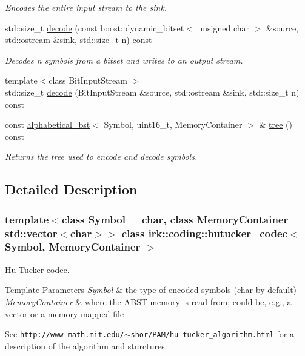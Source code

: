 \begin{DoxyCompactItemize}
\begin{DoxyCompactList}\small\item\em Encodes the entire input stream to the sink. \end{DoxyCompactList}\item 
std\+::size\+\_\+t \mbox{\hyperlink{classirk_1_1coding_1_1hutucker__codec_a888f087a0e3f164fdc79447af8be45d6}{decode}} (const boost\+::dynamic\+\_\+bitset$<$ unsigned char $>$ \&source, std\+::ostream \&sink, std\+::size\+\_\+t n) const
\begin{DoxyCompactList}\small\item\em Decodes {\ttfamily n} symbols from a bitset and writes to an output stream. \end{DoxyCompactList}\item 
{\footnotesize template$<$class Bit\+Input\+Stream $>$ }\\std\+::size\+\_\+t \mbox{\hyperlink{classirk_1_1coding_1_1hutucker__codec_ad263959ac052978df466598084c4ed46}{decode}} (Bit\+Input\+Stream \&source, std\+::ostream \&sink, std\+::size\+\_\+t n) const
\item 
const \mbox{\hyperlink{classirk_1_1alphabetical__bst}{alphabetical\+\_\+bst}}$<$ Symbol, uint16\+\_\+t, Memory\+Container $>$ \& \mbox{\hyperlink{classirk_1_1coding_1_1hutucker__codec_a71cf06393d088f76531fe713e06baa1a}{tree}} () const
\begin{DoxyCompactList}\small\item\em Returns the tree used to encode and decode symbols. \end{DoxyCompactList}\end{DoxyCompactItemize}


\subsection{Detailed Description}
\subsubsection*{template$<$class Symbol = char, class Memory\+Container = std\+::vector$<$char$>$$>$\newline
class irk\+::coding\+::hutucker\+\_\+codec$<$ Symbol, Memory\+Container $>$}

Hu-\/\+Tucker codec. 


\begin{DoxyTemplParams}{Template Parameters}
{\em Symbol} & the type of encoded symbols ({\ttfamily char} by default) \\
\hline
{\em Memory\+Container} & where the A\+B\+ST memory is read from; could be, e.\+g., a vector or a memory mapped file\\
\hline
\end{DoxyTemplParams}
See \href{http://www-math.mit.edu/~shor/PAM/hu-tucker_algorithm.html}{\tt http\+://www-\/math.\+mit.\+edu/$\sim$shor/\+P\+A\+M/hu-\/tucker\+\_\+algorithm.\+html} for a description of the algorithm and sturctures. 

